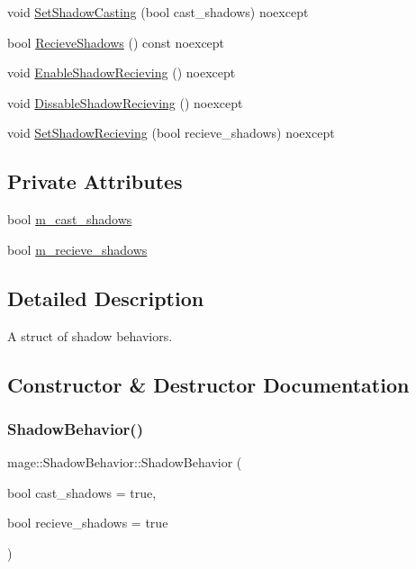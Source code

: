 \begin{DoxyCompactItemize}
\item 
void \hyperlink{structmage_1_1_shadow_behavior_abaab2edba5be7a15762cd4558c5105ad}{Set\+Shadow\+Casting} (bool cast\+\_\+shadows) noexcept
\item 
bool \hyperlink{structmage_1_1_shadow_behavior_a8a4313130558be85ff9a3b8c890f0014}{Recieve\+Shadows} () const noexcept
\item 
void \hyperlink{structmage_1_1_shadow_behavior_a2677d74bb3efe1007d4e1de4a6f215d6}{Enable\+Shadow\+Recieving} () noexcept
\item 
void \hyperlink{structmage_1_1_shadow_behavior_a7ed68217124fdb36f3f96507f30cfad1}{Dissable\+Shadow\+Recieving} () noexcept
\item 
void \hyperlink{structmage_1_1_shadow_behavior_a6413188d55a94098afc4e529b3e78e0d}{Set\+Shadow\+Recieving} (bool recieve\+\_\+shadows) noexcept
\end{DoxyCompactItemize}
\subsection*{Private Attributes}
\begin{DoxyCompactItemize}
\item 
bool \hyperlink{structmage_1_1_shadow_behavior_a6547a03bf1871ad4a9c98cc2f72ff297}{m\+\_\+cast\+\_\+shadows}
\item 
bool \hyperlink{structmage_1_1_shadow_behavior_a1413297989415472337784adcba739d3}{m\+\_\+recieve\+\_\+shadows}
\end{DoxyCompactItemize}


\subsection{Detailed Description}
A struct of shadow behaviors. 

\subsection{Constructor \& Destructor Documentation}
\hypertarget{structmage_1_1_shadow_behavior_ae4c778a02a208462d43641fa4fb10f34}{}\label{structmage_1_1_shadow_behavior_ae4c778a02a208462d43641fa4fb10f34} 
\subsubsection{\texorpdfstring{Shadow\+Behavior()}{ShadowBehavior()}\hspace{0.1cm}{\footnotesize\ttfamily [1/3]}}
{\footnotesize\ttfamily mage\+::\+Shadow\+Behavior\+::\+Shadow\+Behavior (\begin{DoxyParamCaption}\item[{bool}]{cast\+\_\+shadows = {\ttfamily true},  }\item[{bool}]{recieve\+\_\+shadows = {\ttfamily true} }\end{DoxyParamCaption})\hspace{0.3cm}{\ttfamily [explicit]}}

